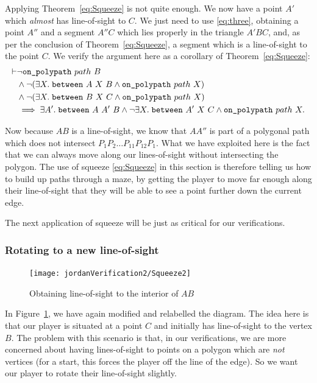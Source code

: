 Applying Theorem~\ref{eq:Squeeze} is not quite enough. We now have a point $A'$ which \emph{almost} has line-of-sight to $C$. We just need to use \ref{eq:three}, obtaining a point $A''$ and a segment $A''C$ which lies properly in the triangle $A'BC$, and, as per the conclusion of Theorem~\ref{eq:Squeeze}, a segment which is a line-of-sight to the point $C$. We verify the argument here as a corollary of Theorem~\ref{eq:Squeeze}:
\begin{equation}\label{eq:Squeeze2}
  \begin{aligned}
\vdash    &\neg\texttt{on\_polypath}\ path\ B\\
    &\wedge \neg(\exists X.\; \texttt{between}\ A\ X\ B \wedge \texttt{on\_polypath}\ path\ X)\\
    &\wedge \neg(\exists X.\; \texttt{between}\ B\ X\ C \wedge \texttt{on\_polypath}\ path\ X)\\
    &\implies \exists A'.\; \texttt{between}\ A\ A'\ B \wedge \neg\exists X.\; \texttt{between}\ A'\ X\ C \wedge \texttt{on\_polypath}\ path\ X.
  \end{aligned}
\end{equation}

Now because $AB$ is a line-of-sight, we know that $AA''$ is part of a polygonal path which does not intersect $P_1P_2\ldots P_{11}P_{12}P_{1}$. What we have exploited here is the fact that we can always move along our lines-of-sight without intersecting the polygon. The use of squeeze \eqref{eq:Squeeze} in this section is therefore telling us how to build up paths through a maze, by getting the player to move far enough along their line-of-sight that they will be able to see a point further down the current edge. 

The next application of squeeze will be just as critical for our verifications.

\subsubsection{Rotating to a new line-of-sight}\label{sec:RotateToNew}
\begin{figure}
\centering\texttt{[image: jordanVerification2/Squeeze2]}
\caption{Obtaining line-of-sight to the interior of $AB$}
\label{fig:Squeeze2}
\end{figure}
In Figure~\ref{fig:Squeeze2}, we have again modified and relabelled the diagram. The idea here is that our player is situated at a point $C$ and initially has line-of-sight to the vertex $B$. The problem with this scenario is that, in our verifications, we are more concerned about having lines-of-sight to points on a polygon which are \emph{not} vertices (for a start, this forces the player off the line of the edge).  So we want our player to rotate their line-of-sight slightly. 

